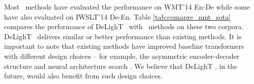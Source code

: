  Most \sota~methods have evaluated the performance on WMT'14 En-De while some have also evaluated on IWSLT'14 De-En. Table \ref{tab:comapre_nmt_sota} compares the performance of DeLighT ~with \sota~methods on these two corpora. DeLighT ~delivers similar or better performance than existing methods. It is important to note that existing methods have improved baseline transformers with different design choices -- for example, the asymmetric encoder-decoder structure \citep{wang2019learning} and neural architecture search \citep{so2019evolved}. We believe that DeLighT , in the future, would also benefit from such design choices. 

\begin{table}[t!]
    \centering
    \begin{subtable}[b]{0.52\columnwidth}
        \caption{IWSLT'14 De-En}
    \end{subtable}
    \hfill
    \begin{subtable}[b]{0.47\columnwidth}
\end{subtable}
\end{table}
